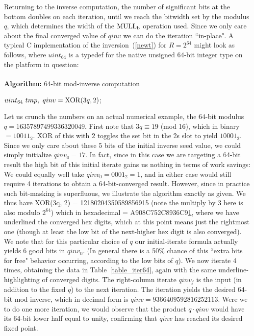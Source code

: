 \documentclass{article}
\begin{document}
Returning to the inverse computation, the number of significant bits at the bottom doubles on each iteration, until we reach the bitwidth set by the modulus $q$, which determines the width of the ${\rm MULL_b}$ operation used. Since we only care about the final converged value of $qinv$ we can do the iteration ``in-place". A typical C implementation of the inversion~(\ref{newt}) for $R = 2^{64}$ might look as follows, where $uint_{64}$ is a typedef for the native unsigned 64-bit integer type on the platform in question:\\
\\
{\bf Algorithm:} {64-bit mod-inverse computation}\\
\begin{algorithm}[H]
\vspace{0.1in}
	{
	$uint_{64}\ tmp,\ qinv = {\rm XOR}(3q, 2)$;\\
}
\end{algorithm}
\vspace{0.2in}
Let us crunch the numbers on an actual numerical example, the 64-bit modulus $q = 16357897499336320049$. First note that $3q \equiv 19$ (mod 16), which in binary $= 10011_2$. XOR of this with 2 toggles the set bit in the 2s slot to yield $10001_2$. Since we only care about these 5 bits of the initial inverse seed value, we could simply initialize $qinv_0 = 17$. In fact, since in this case we are targeting a 64-bit result the high bit of this initial iterate gains us nothing in terms of work savings: We could equally well take $qinv_0 = 0001_2 = 1$, and in either case would still require 4 iterations to obtain a 64-bit-converged result. However, since in practice such bit-masking is superfluous, we illustrate the algorithm exactly as given. We thus have XOR(3q, 2) = 12180204350589856915 (note the multiply by 3 here is also modulo $2^{64}$) which in hexadecimal = A908C752C8936C9\underline{1}, where we have underlined the converged hex digits, which at this point means just the rightmost one (though at least the low bit of the next-higher hex digit is also converged). We note that for this particular choice of $q$ our initial-iterate formula actually yields 6 good bits in $qinv_0$. (In general there is a 50\% chance of this ``extra bits for free" behavior occurring, according to the low bits of $q$). We now iterate 4 times, obtaining the data in Table~\ref{table_iter64}, again with the same underline-highlighting of converged digits. The right-column iterate $qinv_j$ is the input (in addition to the fixed $q$) to the next iteration. The iteration yields the desired 64-bit mod inverse, which in decimal form is $qinv = 9366409592816252113$. Were we to do one more iteration, we would observe that the product $q \cdot qinv$ would have its 64-bit lower half equal to unity, confirming that $qinv$ has reached its desired fixed point.
\end{document}
